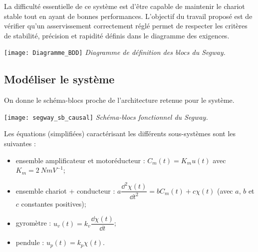 \begin{multicols}{2}
\begin{obj}
La difficulté essentielle de ce système est d'être capable de maintenir le chariot stable tout en ayant de bonnes performances. L'objectif du travail proposé est de vérifier qu'un asservissement correctement réglé permet de respecter les critères de stabilité, précision et rapidité définis dans le diagramme des exigences.
\end{obj}


\begin{center}%
\texttt{[image: Diagramme\_BDD]}
\textit{Diagramme de définition des blocs du Segway\textregistered.}
\label{ex_Segway_BDD}
\end{center}%



\subsection*{Modéliser le système}

On donne le schéma-blocs proche de l'architecture retenue pour le système.%

\begin{center}%
\texttt{[image: segway\_sb\_causal]}
\textit{Schéma-blocs fonctionnel du Segway\textregistered.}
\label{segway_sb1}
\end{center}%

Les équations (simplifiées) caractérisant les différents sous-systèmes sont les suivantes :
\begin{itemize}
\item ensemble amplificateur et motoréducteur :  $C_m(t)=K_m u(t)$ avec $K_m=\SI{2}{Nm V^{-1}}$;
\item ensemble chariot + conducteur :  $a\dfrac{\dd^2 \chi(t)}{\dd t^2}=bC_m(t)+c \chi(t)$ (avec $a$, $b$ et $c$ constantes positives); 
\item gyromètre :  $u_v(t)=k_v \dfrac{\dd\chi(t)}{\dd t}$;
\item pendule :  $u_p(t)=k_p \chi(t)$.
\end{itemize}





\end{multicols}

